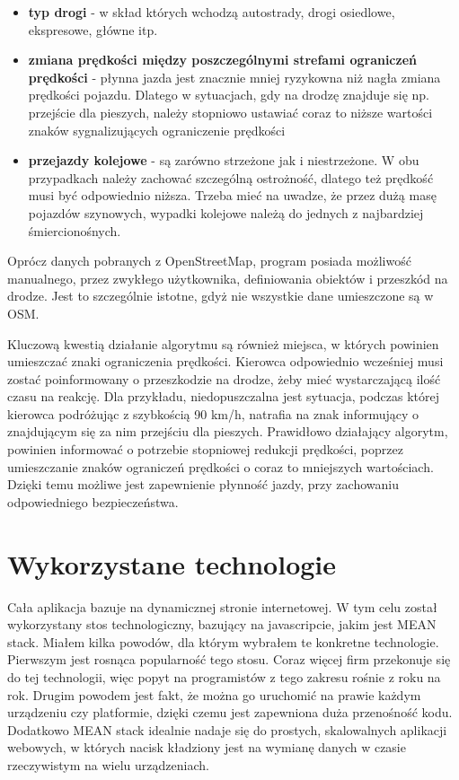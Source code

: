 \begin{itemize}
\item \textbf{typ drogi} - w skład których wchodzą autostrady, drogi osiedlowe, ekspresowe, główne itp.
\item \textbf{zmiana prędkości między poszczególnymi strefami ograniczeń prędkości} - płynna jazda jest znacznie mniej ryzykowna niż nagła zmiana prędkości pojazdu. Dlatego w sytuacjach, gdy na drodzę znajduje się np. przejście dla pieszych, należy stopniowo ustawiać coraz to niższe wartości znaków sygnalizujących ograniczenie prędkości
\item \textbf{przejazdy kolejowe} - są zarówno strzeżone jak i niestrzeżone. W obu przypadkach należy zachować szczególną ostrożność, dlatego też prędkość musi być odpowiednio niższa. Trzeba mieć na uwadze, że przez dużą masę pojazdów szynowych, wypadki kolejowe należą do jednych z najbardziej śmiercionośnych.
\end{itemize}

Oprócz danych pobranych z OpenStreetMap, program posiada możliwość manualnego, przez zwykłego użytkownika, definiowania obiektów i przeszkód na drodze. Jest to szczególnie istotne, gdyż nie wszystkie dane umieszczone są w OSM.


Kluczową kwestią działanie algorytmu są również miejsca, w których powinien umieszczać znaki ograniczenia prędkości. Kierowca odpowiednio wcześniej musi zostać poinformowany o przeszkodzie na drodze, żeby mieć wystarczającą ilość czasu na reakcję. Dla przykładu, niedopuszczalna jest sytuacja, podczas której kierowca podróżując z szybkością 90 km/h, natrafia na znak informujący o znajdującym się za nim przejściu dla pieszych. Prawidłowo działający algorytm, powinien informować o potrzebie stopniowej redukcji prędkości, poprzez umieszczanie znaków ograniczeń prędkości o coraz to mniejszych wartościach. Dzięki temu możliwe jest zapewnienie płynność jazdy, przy zachowaniu odpowiedniego bezpieczeństwa.





\section{Wykorzystane technologie}
\label{sec:wykorzystaneTechnologie}
	Cała aplikacja bazuje na dynamicznej stronie internetowej. W tym celu został wykorzystany stos technologiczny, bazujący na javascripcie, jakim jest MEAN stack. Miałem kilka powodów, dla którym wybrałem te konkretne technologie. Pierwszym jest rosnąca popularność tego stosu. Coraz więcej firm przekonuje się do tej technologii, więc popyt na programistów z tego zakresu rośnie z roku na rok. Drugim powodem jest fakt, że można go uruchomić na prawie każdym urządzeniu czy platformie, dzięki czemu jest zapewniona duża przenośność kodu. Dodatkowo MEAN stack idealnie nadaje się do prostych, skalowalnych aplikacji webowych, w których nacisk kładziony jest na wymianę danych w czasie rzeczywistym na wielu urządzeniach.

